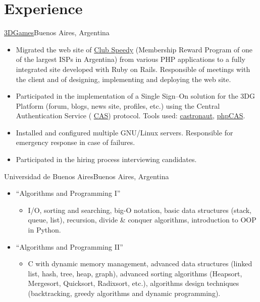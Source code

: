 \documentclass[11pt,a4paper]{moderncv}
\newcommand\weblink[2] {{\color{href} \href{#1}{#2}}}
\begin{document}
\section{Experience}
{\weblink{http://www.3dgames.com.ar}{3DGames}}{Buenos Aires, Argentina}{}{%
\begin{itemize}
  \item Migrated the web site of \weblink{http://club.speedy.com.ar}{Club
    Speedy} (Membership Reward Program of one of the largest ISPs in Argentina)
    from various PHP applications to a fully integrated site developed with
    Ruby on Rails. Responsible of meetings with the client and of designing,
    implementing and deploying the web site.
  \item Participated in the implementation of a Single Sign--On solution for
    the 3DG Platform (forum, blogs, news site, profiles, etc.) using the
    Central Authentication Service
    (\weblink{http://en.wikipedia.org/wiki/Central_Authentication_Service}{CAS})
    protocol. Tools used:
    \weblink{https://github.com/relevance/castronaut}{castronaut},
    \weblink{https://wiki.jasig.org/display/CASC/phpCAS}{phpCAS}.
  \item Installed and configured multiple GNU/Linux servers. Responsible for
    emergency response in case of failures.
  \item Participated in the hiring process interviewing candidates.
\end{itemize}
}
%
{Universidad de Buenos Aires}{Buenos Aires, Argentina}{}{%
\begin{itemize}%
  \item ``Algorithms and Programming I''
    \begin{itemize}%
      \item I/O, sorting and searching, big-O notation, basic data structures
        (stack, queue, list), recursion, divide \& conquer algorithms,
        introduction to OOP in Python.
    \end{itemize}
  \item ``Algorithms and Programming II''
    \begin{itemize}%
      \item C with dynamic memory management, advanced data structures (linked
          list, hash, tree, heap, graph), advanced sorting algorithms
          (Heapsort, Mergesort, Quicksort, Radixsort, etc.), algorithms design
          techniques (backtracking, greedy algorithms and dynamic programming).
    \end{itemize}
\end{itemize}
}
\end{document}
